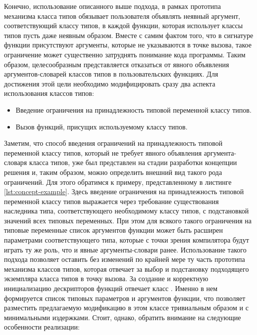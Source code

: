 Конечно, использование описанного выше подхода, в рамках прототипа механизма класса типов обязывает пользователя объявлять неявный аргумент, соответствующий классу типов, в каждой функции, которая использует классы типов пусть даже неявным образом. Вместе с самим фактом того, что в сигнатуре функции присутствуют аргументы, которые не указываются в точке вызова, такое ограничение может существенно затруднять понимание кода программы. Таким образом, целесообразным представляется отказаться от явного объявления аргументов-словарей классов типов в пользовательских функциях. Для достижения этой цели необходимо модифицировать сразу два аспекта использования классов типов:
\begin{itemize}
    \item Введение ограничения на принадлежность типовой переменной классу типов. 
    \item Вызов функций, присущих используемому классу типов. 
\end{itemize}
Заметим, что способ введения ограничений на принадлежность типовой переменной классу типов, который не требует явного объявления аргумента-словаря класса типов, уже был представлен на стадии разработки концепции решения и, таким образом, можно определить внешний вид такого рода ограничений. Для этого обратимся к примеру, представленному в листинге \ref{lst:concept-example}. Здесь введение ограничения на принадлежность типовой переменной классу типов выражается через требование существования наследника типа, соответствующего необходимому классу типов, с подстановкой значений всех типовых переменных. При этом для всякого такого ограничения на типовые переменные список аргументов функции может быть расширен параметрами соответствующего типа, которые с точки зрения компилятора будут играть ту же роль, что и явные аргументы-словари ранее. Использование такого подхода позволяет оставить без изменений по крайней мере ту часть прототипа механизма классов типов, которая отвечает за выбор и подстановку подходящего экземпляра класса типов в точку вызова. За создание и корректную инициализацию дескрипторов функций отвечает класс . Именно в нем формируется список типовых параметров и аргументов функции, что позволяет разместить предлагаемую модификацию в этом классе тривиальным образом и с минимальными издержками. Стоит, однако, обратить внимание на следующие особенности реализации:
